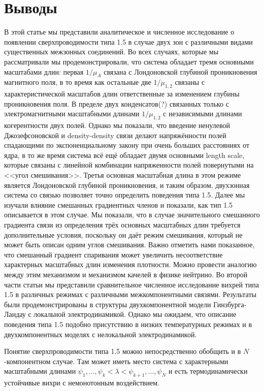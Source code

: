 \chapter{Выводы}
\label{ch:5}

В этой статье мы представили аналитическое и численное исследование о 
появлении сверхпроводимости типа 1.5 в случае двух зон с различными видами 
существенных межзонных соединений. Во всех случаях, которые мы рассматривали 
мы продемонстрировали, что система обладает тремя основными масштабами длин: 
первая \( 1/\mu_A \) связана с Лондоновской глубиной 
проникновения магнитного поля, в то время как остальные две \( 1/\mu_{1,2} \) 
связаны с характеристической масштабов длин ответственные за изменением 
глубины проникновения поля. В пределе двух конденсатов(?) связанных только с 
электромагнитными масштабными длинами \( 1/\mu_{1,2} \) с независимыми  
длинами когерентности двух полей. Однако мы показали, что введение ненулевой 
Джозефсоновской и density-density связи делают напряжённости полей спадающими 
по экспоненциальному закону при очень больших расстояниях от ядра, в то же 
время система всё ещё обладает двумя основными length scale, которые связаны 
с линейной комбинации напряженности полей повернутыми на <<угол смешивания>>. 
Третья основная масштабная длина в этом режиме является Лондоновской глубиной 
проникновения, и таким образом, двухзонная система со связью позволяет точно 
определить поведения типа 1.5. Далее мы изучали влияние смешанных градиентных 
членов и показали, как тип 1.5 описывается в этом случае. Мы показали, что в 
случае значительного смешанного градиента связи из определения трёх основных 
масштабных длин требуется дополнительные условия, поскольку он даёт режим 
смешивания, который не может быть описан одним углов смешивания. Важно 
отметить нами показанное, что смешанный градиент спаривания может увеличить 
несоответствие характерных масштабных длин изменения плотности. Можно провести 
аналогию между этим механизмом и механизмом качелей в физике нейтрино. Во 
второй части статьи мы представили сравнительное численное исследование 
вихрей типа 1.5 в различных режимах с различными межкомпонентными связями. 
Результаты были продемонстрированы в структуры двухкомпонентной модели 
Гинзбурга-Ландау с локальной электродинамикой. Однако мы ожидаем, что 
описание поведения типа 1.5 подобно присутствию в низких температурных 
режимах и в двухкомпонентных моделях с нелокальной электродинамикой.   

Понятие сверхпроводимости типа 1.5 можно непосредственно обобщить и в 
\( N \)-компонентном случае. Там может иметь место система с  
характерными масштабными длинами 
\( 
	\psi_1, \ldots, \psi_k < \lambda < \psi_{k+1}, \ldots, \psi_N
\) 
и есть термодинамически устойчивые вихри с немонотонным воздействием. 

